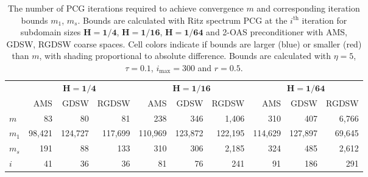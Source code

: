 \begin{table}[H]
\centering
\caption{The number of PCG iterations required to achieve convergence $m$ and corresponding iteration bounds $m_1$, $m_s$. Bounds are calculated with Ritz spectrum PCG at the $i^{\textrm{th}}$ iteration for subdomain sizes $\mathbf{H=1/4}$, $\mathbf{H=1/16}$, $\mathbf{H=1/64}$ and 2-OAS preconditioner with AMS, GDSW, RGDSW coarse spaces. Cell colors indicate if bounds are larger (blue) or smaller (red) than $m$, with shading proportional to absolute difference. Bounds are calculated with $\eta=5$, $\tau=0.1$, $i_{\max}=300$ and $r=0.5$.}
\label{tab:cg_iteration_bounds}
\begin{tabular}{lrrrrrrrrr}
\toprule
 & \multicolumn{3}{c}{$\mathbf{H=1/4}$} & \multicolumn{3}{c}{$\mathbf{H=1/16}$} & \multicolumn{3}{c}{$\mathbf{H=1/64}$} \\
 & AMS & GDSW & RGDSW & AMS & GDSW & RGDSW & AMS & GDSW & RGDSW \\
\midrule
$m$ & 83 & 80 & 81 & 238 & 346 & 1,406 & 310 & 407 & 6,766 \\
\cline{1-10}
$m_1$ & {\cellcolor[HTML]{AFC9F6}} \color[HTML]{000000} 98,421 & {\cellcolor[HTML]{AFC9F6}} \color[HTML]{000000} 124,727 & {\cellcolor[HTML]{AFC9F6}} \color[HTML]{000000} 117,699 & {\cellcolor[HTML]{AFC9F6}} \color[HTML]{000000} 110,969 & {\cellcolor[HTML]{7EAFF1}} \color[HTML]{000000} 123,872 & {\cellcolor[HTML]{AFC9F6}} \color[HTML]{000000} 122,195 & {\cellcolor[HTML]{AFC9F6}} \color[HTML]{000000} 114,629 & {\cellcolor[HTML]{AFC9F6}} \color[HTML]{000000} 127,897 & {\cellcolor[HTML]{7EAFF1}} \color[HTML]{000000} 69,645 \\
\cline{1-10}
$m_s$ & {\cellcolor[HTML]{7EAFF1}} \color[HTML]{000000} 191 & {\cellcolor[HTML]{7EAFF1}} \color[HTML]{000000} 88 & {\cellcolor[HTML]{7EAFF1}} \color[HTML]{000000} 133 & {\cellcolor[HTML]{7EAFF1}} \color[HTML]{000000} 310 & {\cellcolor[HTML]{945357}} \color[HTML]{F1F1F1} 306 & {\cellcolor[HTML]{7EAFF1}} \color[HTML]{000000} 2,185 & {\cellcolor[HTML]{7EAFF1}} \color[HTML]{000000} 324 & {\cellcolor[HTML]{7EAFF1}} \color[HTML]{000000} 485 & {\cellcolor[HTML]{945357}} \color[HTML]{F1F1F1} 2,612 \\
\cline{1-10}
$i$ & 41 & 36 & 36 & 81 & 76 & 241 & 91 & 186 & 291 \\
\cline{1-10}
\bottomrule
\end{tabular}
\end{table}

